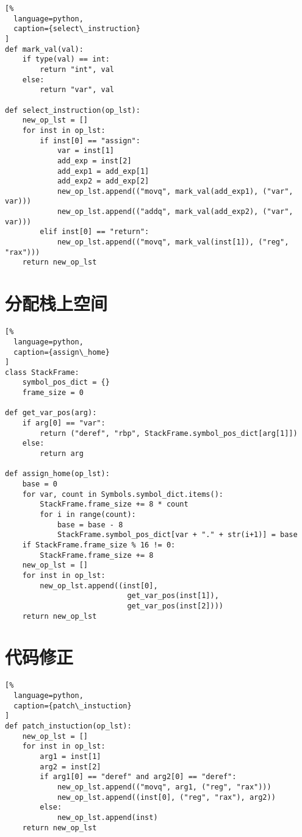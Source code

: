 \begin{lstlisting}[%
  language=python,
  caption={select\_instruction}
]
def mark_val(val):
    if type(val) == int:
        return "int", val
    else:
        return "var", val

def select_instruction(op_lst):
    new_op_lst = []
    for inst in op_lst:
        if inst[0] == "assign":
            var = inst[1]
            add_exp = inst[2]
            add_exp1 = add_exp[1]
            add_exp2 = add_exp[2]
            new_op_lst.append(("movq", mark_val(add_exp1), ("var", var)))
            new_op_lst.append(("addq", mark_val(add_exp2), ("var", var)))
        elif inst[0] == "return":
            new_op_lst.append(("movq", mark_val(inst[1]), ("reg", "rax")))
    return new_op_lst
\end{lstlisting}

\section{分配栈上空间}

\begin{lstlisting}[%
  language=python,
  caption={assign\_home}
]
class StackFrame:
    symbol_pos_dict = {}
    frame_size = 0

def get_var_pos(arg):
    if arg[0] == "var":
        return ("deref", "rbp", StackFrame.symbol_pos_dict[arg[1]])
    else:
        return arg

def assign_home(op_lst):
    base = 0
    for var, count in Symbols.symbol_dict.items():
        StackFrame.frame_size += 8 * count
        for i in range(count):
            base = base - 8
            StackFrame.symbol_pos_dict[var + "." + str(i+1)] = base
    if StackFrame.frame_size % 16 != 0:
        StackFrame.frame_size += 8
    new_op_lst = []
    for inst in op_lst:
        new_op_lst.append((inst[0], 
                            get_var_pos(inst[1]), 
                            get_var_pos(inst[2])))
    return new_op_lst
\end{lstlisting}


\section{代码修正}

\begin{lstlisting}[%
  language=python,
  caption={patch\_instuction}
]
def patch_instuction(op_lst):
    new_op_lst = []
    for inst in op_lst:
        arg1 = inst[1]
        arg2 = inst[2]
        if arg1[0] == "deref" and arg2[0] == "deref":
            new_op_lst.append(("movq", arg1, ("reg", "rax")))
            new_op_lst.append((inst[0], ("reg", "rax"), arg2))
        else:
            new_op_lst.append(inst)
    return new_op_lst
\end{lstlisting}

